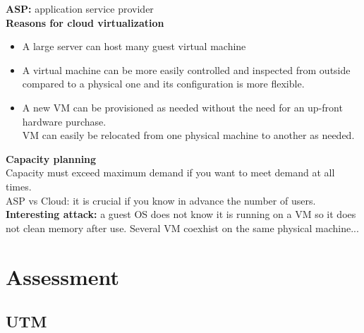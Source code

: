 \documentclass[10pt,a4paper]{book}
\begin{document}
\textbf{ASP:} application service provider\\
\textbf{Reasons for cloud virtualization}
\begin{itemize}
\item A large server can host many guest virtual machine
\item A virtual machine can be more easily controlled and inspected from outside compared to a physical one and its configuration is more flexible.
\item A new VM can be provisioned as needed without the need for an up-front hardware purchase.\\
VM can easily be relocated from one physical machine to another as needed.
\end{itemize}
\textbf{Capacity planning}\\
Capacity must exceed maximum demand if you want to meet demand at all times.\\
ASP vs Cloud: it is crucial if you know in advance the number of users.
\textbf{Interesting attack:} a guest OS does not know it is running on a VM so it does not clean memory after use. Several VM coexhist on the same physical machine...
\chapter{Assessment}
\section{UTM}
\end{document}
